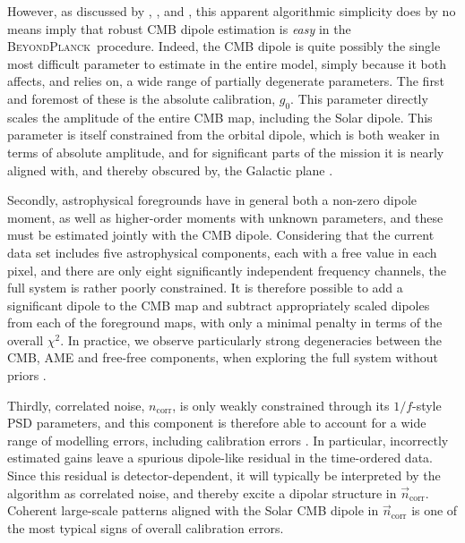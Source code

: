 \documentclass[twocolumn]{aa}
\newcommand{\n}[0]{\vec{n}}
\newcommand{\BP}{\textsc{BeyondPlanck}}
\begin{document}
However, as discussed by \citet{bp06}, \citet{bp07}, and \citet{bp10},
this apparent algorithmic simplicity does by no means imply that
robust CMB dipole estimation is \emph{easy} in the
\BP\ procedure. Indeed, the CMB dipole is quite possibly the single
most difficult parameter to estimate in the entire model, simply
because it both affects, and relies on, a wide range of partially
degenerate parameters. The first and foremost of these is the
absolute calibration, $g_0$. This parameter directly scales the
amplitude of the entire CMB map, including the Solar dipole. This
parameter is itself constrained from the orbital dipole, which is both
 weaker in terms of absolute amplitude, and for significant
parts of the mission it is nearly aligned with, and thereby obscured by, the
Galactic plane \citep{bp07}.

Secondly, astrophysical foregrounds have in general both a non-zero
dipole moment, as well as higher-order moments with unknown
parameters, and these must be estimated jointly with the CMB
dipole. Considering that the current data set includes five
astrophysical components, each with a free value in each pixel, and
there are only eight significantly independent frequency channels, the
full system is rather poorly constrained. It is therefore possible to
add a significant dipole to the CMB map and subtract appropriately
scaled dipoles from each of the foreground maps, with only a minimal
penalty in terms of the overall $\chi^2$. In practice, we observe
particularly strong degeneracies between the CMB, AME and free-free
components, when exploring the full system without priors
\citep{bp13}.

Thirdly, correlated noise, $n_{\mathrm{corr}}$, is only weakly
constrained through its $1/f$-style PSD parameters, and this component
is therefore able to account for a wide range of modelling errors,
including calibration errors \citep{bp06,bp17}. In particular,
incorrectly estimated gains leave a spurious dipole-like residual in
the time-ordered data. Since this residual is detector-dependent, it
will typically be interpreted by the algorithm as correlated noise,
and thereby excite a dipolar structure in
$\n_{\mathrm{corr}}$. Coherent large-scale patterns aligned with the
Solar CMB dipole in $\n_{\mathrm{corr}}$ is one of the most typical
signs of overall calibration errors.
\end{document}
